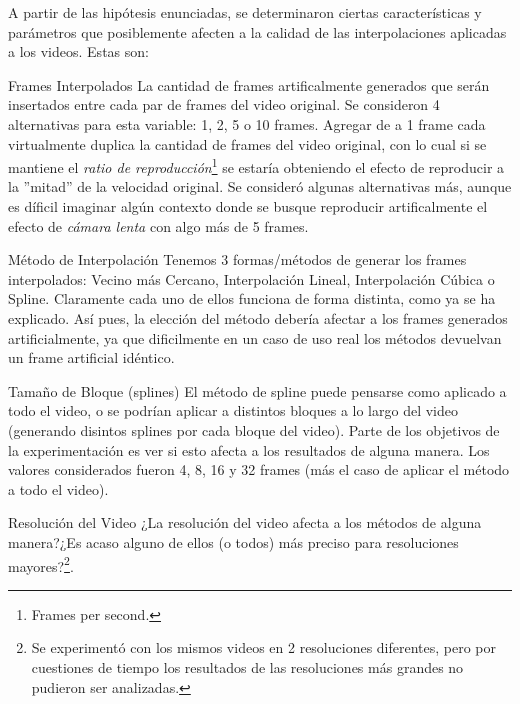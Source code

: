 A partir de las hip\'otesis enunciadas, se determinaron
ciertas caracter\'isticas y par\'ametros que posiblemente afecten a la calidad
de las interpolaciones aplicadas a los videos. Estas son:

\begin{LaTeXdescription}
    \item[Frames Interpolados] La cantidad de frames artificalmente generados
        que ser\'an insertados entre cada par de frames del video original. Se
        consideron 4 alternativas para esta variable: 1, 2, 5 o 10 frames.
        Agregar de a 1 frame cada virtualmente duplica la cantidad de frames
        del video original, con lo cual si se mantiene el \emph{ratio de
        reproducci\'on}\footnote{Frames per second.} se estar\'ia obteniendo el
        efecto de reproducir a la ''mitad'' de la velocidad original. Se
        consider\'o algunas alternativas m\'as, aunque es d\'ificil imaginar
        alg\'un contexto donde se busque reproducir artificalmente el efecto de
        \emph{c\'amara lenta} con algo m\'as de 5 frames.\medskip

    \item[M\'etodo de Interpolaci\'on] Tenemos 3 formas/m\'etodos de generar
        los frames interpolados: Vecino m\'as Cercano, Interpolaci\'on Lineal,
        Interpolaci\'on C\'ubica o Spline. Claramente cada uno de ellos funciona
        de forma distinta, como ya se ha explicado. As\'i pues, la elecci\'on
        del m\'etodo deber\'ia afectar a los frames generados artificialmente,
        ya que dificilmente en un caso de uso real los m\'etodos devuelvan un
        frame artificial id\'entico.\medskip

    \item[Tama\~no de Bloque (splines)] El m\'etodo de spline puede pensarse
        como aplicado a todo el video, o se podr\'ian aplicar a distintos
        bloques a lo largo del video (generando disintos splines por cada
        bloque del video).  Parte de los objetivos de la experimentaci\'on es
        ver si esto afecta a los resultados de alguna manera. Los valores
        considerados fueron 4, 8, 16 y 32 frames (m\'as el caso de aplicar el
        m\'etodo a todo el video).\medskip

    \item[Resoluci\'on del Video] ¿La resoluci\'on del video afecta a los
        m\'etodos de alguna manera?¿Es acaso alguno de ellos (o todos) m\'as
        preciso para resoluciones mayores?\footnote{Se experiment\'o con los
        mismos videos en 2 resoluciones diferentes, pero por cuestiones de
        tiempo los resultados de las resoluciones m\'as grandes no pudieron ser
        analizadas.}.\medskip


\end{LaTeXdescription}

